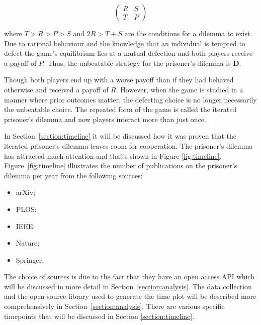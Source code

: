 \documentclass{article}
\begin{document}
\begin{equation} \label{eq:the_pd_payoffs}
    \begin{pmatrix}
    R & S \\ T & P
    \end{pmatrix}
\end{equation}

where \(T > R > P > S \) and \(2R > T + S\) are the conditions for a dilemma
to exist. Due to rational behaviour and the knowledge that an individual is tempted
to defect the game's equilibrium lies at a mutual defection and both players
receive a payoff of \(P\). Thus, the unbeatable strategy for the prisoner's dilemma
is \textbf{D}.

Though both players end up with a worse payoff than if they had behaved
otherwise and received a payoff of \(R\). However, when the game is studied
in a manner where prior outcomes matter, the defecting choice is no longer
necessarily the unbeatable choice. The repeated form of
the game is called the iterated prisoner's dilemma and now players interact
more than just once.

In Section~\ref{section:timeline} it will be discussed how it was proven that
the iterated prisoner's dilemma leaves room for cooperation. The prisoner's
dilemma has attracted much attention and that's shown in Figure
\ref{fig:timeline}. Figure~\ref{fig:timeline} illustrates the number of 
publications on the prisoner's dilemma per year from the following sources:

\begin{multicols}{3}
    \begin{itemize}
        \item arXiv;
        \item PLOS;
        \item IEEE;
        \item Nature;
        \item Springer.
    \end{itemize}
\end{multicols}

The choice of sources is due to the fact that they have an open access API
which will be discussed in more detail in Section~\ref{section:analysis}. %
The data collection and the open source library used to generate the time plot 
will be described more comprehensively in Section~\ref{section:analysis}.
There are various specific timepoints that will be discussed in Section
\ref{section:timeline}.
\end{document}
